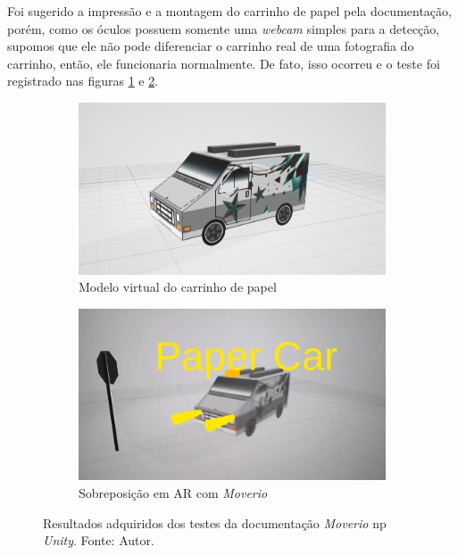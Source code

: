 Foi sugerido a impressão e a montagem do carrinho de papel pela documentação, porém, como os óculos possuem somente uma \textit{webcam} simples para a detecção, supomos que ele não pode diferenciar o carrinho real de uma fotografia do carrinho, então, ele funcionaria normalmente. De fato, isso ocorreu e o teste foi registrado nas figuras \ref{fig:papercar-stl} e \ref{fig:papercar-ar}.

\begin{figure}[ht]
    \centering
        \begin{subfigure}{.45\textwidth}
            \centering
            \includegraphics[width=.95\textwidth]{figuras/PaperCar.png}
            \caption{Modelo virtual do carrinho de papel}
            \label{fig:papercar-stl}
        \end{subfigure}
        \begin{subfigure}{.45\textwidth}
            \centering
            \includegraphics[width=.95\textwidth]{figuras/PaperCarAR.png}
            \caption{Sobreposição em AR com \textit{Moverio}}
            \label{fig:papercar-ar}
        \end{subfigure}
        \caption{Resultados adquiridos dos testes da documentação \textit{Moverio} np \textit{Unity}. Fonte: Autor.}
        \label{fig:papercar-tests}
\end{figure}

